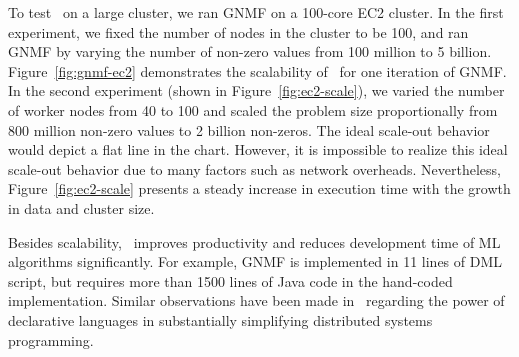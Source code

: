  To test \systemmltext\ on a large cluster, we ran GNMF on a 100-core EC2 cluster. In the first
experiment, we fixed the number of nodes in the cluster to be 100, and ran GNMF by varying the
number of non-zero values from 100 million to 5 billion. Figure~\ref{fig:gnmf-ec2} demonstrates the
scalability of \systemmltext\ for one iteration of GNMF. In the second experiment (shown in Figure~\ref{fig:ec2-scale}), 
we varied the number of worker nodes from 40 to 100 and scaled the problem size proportionally from 800 million non-zero values to 2 billion non-zeros. The
ideal scale-out behavior would depict a flat line in the chart. However, it is impossible to realize this ideal
scale-out behavior due to many factors such as network overheads. Nevertheless, Figure~\ref{fig:ec2-scale} presents a steady increase in execution time 
with the growth in data and cluster size.

Besides scalability, \dmlr\ improves productivity and reduces development time of ML algorithms significantly. For example, GNMF is implemented in 11 lines of DML script, but requires more than 1500 lines of Java code in the hand-coded implementation. Similar observations have been
made in~\cite{boom10} regarding the power of declarative languages in substantially simplifying
distributed systems programming.


